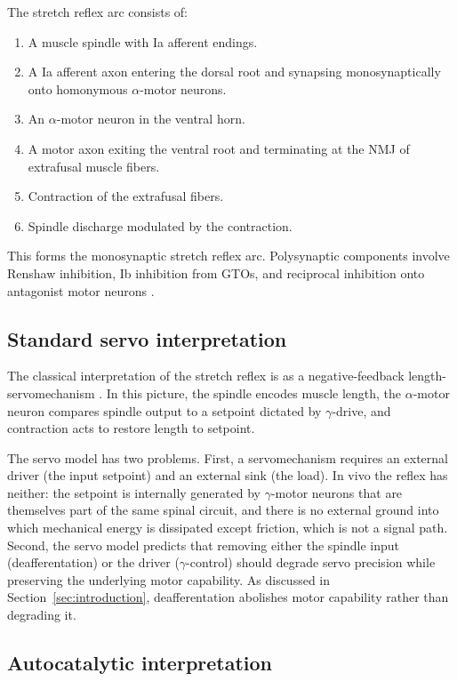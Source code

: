 \documentclass[11pt,twocolumn,a4paper]{article}
\theoremstyle{definition}
\theoremstyle{remark}
\begin{document}
The stretch reflex arc consists of:
\begin{enumerate}[label=(\roman*),leftmargin=*,itemsep=1pt]
\item A muscle spindle with Ia afferent endings.
\item A Ia afferent axon entering the dorsal root and synapsing
monosynaptically onto homonymous $\alpha$-motor neurons.
\item An $\alpha$-motor neuron in the ventral horn.
\item A motor axon exiting the ventral root and terminating at the
NMJ of extrafusal muscle fibers.
\item Contraction of the extrafusal fibers.
\item Spindle discharge modulated by the contraction.
\end{enumerate}
This forms the monosynaptic stretch reflex arc. Polysynaptic components
involve Renshaw inhibition, Ib inhibition from GTOs, and reciprocal
inhibition onto antagonist motor neurons \citep{matthews1972,%
pierrot1996}.

\subsection{Standard servo interpretation}

The classical interpretation of the stretch reflex is as a
negative-feedback length-servomechanism \citep{merton1953,matthews1972}.
In this picture, the spindle encodes muscle length, the
$\alpha$-motor neuron compares spindle output to a setpoint dictated
by $\gamma$-drive, and contraction acts to restore length to setpoint.

The servo model has two problems. First, a servomechanism requires an
external driver (the input setpoint) and an external sink (the load).
In vivo the reflex has neither: the setpoint is internally generated
by $\gamma$-motor neurons that are themselves part of the same spinal
circuit, and there is no external ground into which mechanical energy
is dissipated except friction, which is not a signal path. Second, the
servo model predicts that removing either the spindle input
(deafferentation) or the driver ($\gamma$-control) should degrade
servo precision while preserving the underlying motor capability. As
discussed in Section~\ref{sec:introduction}, deafferentation
abolishes motor capability rather than degrading it.

\subsection{Autocatalytic interpretation}
\end{document}
